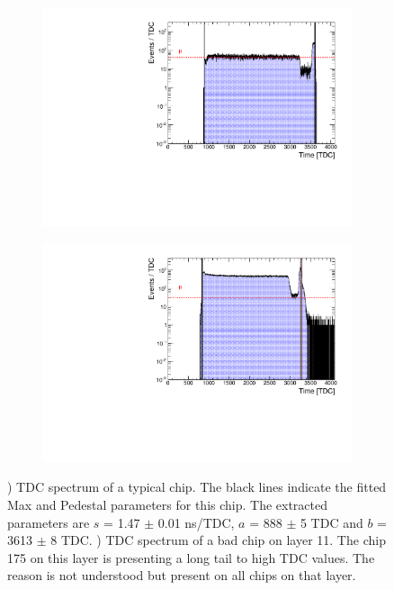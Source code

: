 \begin{figure}[htbp!]
	\begin{subfigure}[t]{0.49\textwidth}
		\centering
		\includegraphics[width=1\linewidth]{../Thesis_Plots/Timing/Muons/Plots/ExampleTDCSpectra.pdf}
		\caption{} \label{fig:TDC_Spectrum}
	\end{subfigure}
	\hfill
	\begin{subfigure}[t]{0.49\textwidth}
		\centering
		\includegraphics[width=1\linewidth]{../Thesis_Plots/Timing/Muons/Plots/BadTDCSpectra_Layer11.pdf}
		\caption{} \label{fig:TDC_Spectrum_bad}
	\end{subfigure}
	\caption{) TDC spectrum of a typical chip. The black lines indicate the fitted Max and Pedestal parameters for this chip. The extracted parameters are $s$ = 1.47 $\pm$ 0.01 ns/TDC, $a$ = 888 $\pm$ 5 TDC and $b$ = 3613 $\pm$ 8 TDC. ) TDC spectrum of a bad chip on layer 11. The chip 175 on this layer is presenting a long tail to high TDC values. The reason is not understood but present on all chips on that layer.}
\end{figure}

